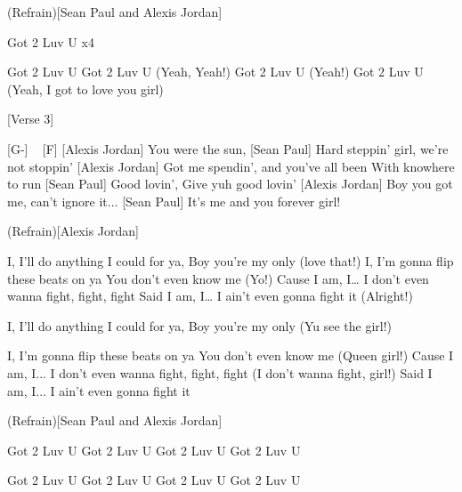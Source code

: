 (Refrain)[Sean Paul and Alexis Jordan]

Got 2 Luv U x4

Got 2 Luv U
Got 2 Luv U (Yeah, Yeah!)
Got 2 Luv U (Yeah!)
Got 2 Luv U (Yeah, I got to love you girl)



[Verse 3]

[G-] ~ [F]
[Alexis Jordan] You were the sun,
[Sean Paul] Hard steppin' girl, we're not stoppin'
[Alexis Jordan] Got me spendin', and you've all been
With knowhere to run
[Sean Paul] Good lovin', Give yuh good lovin'
[Alexis Jordan] Boy you got me, can't ignore it...
[Sean Paul] It's me and you forever girl!

(Refrain)[Alexis Jordan]

I, I’ll do anything I could for ya,
Boy you’re my only (love that!)
I, I’m gonna flip these beats on ya
You don’t even know me (Yo!)
Cause I am, I…
I don’t even wanna fight, fight, fight
Said I am, I…
I ain’t even gonna fight it (Alright!)

I, I’ll do anything I could for ya,
Boy you’re my only (Yu see the girl!)

I, I’m gonna flip these beats on ya
You don’t even know me (Queen girl!)
Cause I am, I...
I don’t even wanna fight, fight, fight (I don't wanna fight, girl!)
Said I am, I...
I ain’t even gonna fight it

(Refrain)[Sean Paul and Alexis Jordan]

Got 2 Luv U
Got 2 Luv U
Got 2 Luv U
Got 2 Luv U

Got 2 Luv U
Got 2 Luv U
Got 2 Luv U
Got 2 Luv U